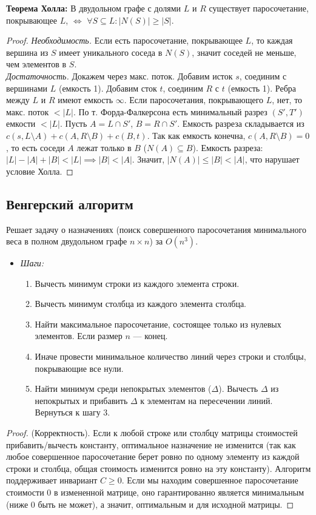 \documentclass[12pt, a4paper]{article}
\begin{document}
\textbf{Теорема Холла:} В двудольном графе с долями $L$ и $R$ существует паросочетание, покрывающее $L$, $\iff$ $\forall S \subseteq L: |N(S)| \ge |S|$.
\begin{proof}
\textit{Необходимость.} Если есть паросочетание, покрывающее $L$, то каждая вершина из $S$ имеет уникального соседа в $N(S)$, значит соседей не меньше, чем элементов в $S$.\\
\textit{Достаточность.} Докажем через макс. поток. Добавим исток $s$, соединим с вершинами $L$ (емкость 1). Добавим сток $t$, соединим $R$ с $t$ (емкость 1). Ребра между $L$ и $R$ имеют емкость $\infty$. Если паросочетания, покрывающего $L$, нет, то макс. поток $< |L|$. По т. Форда-Фалкерсона есть минимальный разрез $(S', T')$ емкости $< |L|$. Пусть $A = L \cap S'$, $B = R \cap S'$. Емкость разреза складывается из $c(s, L \setminus A) + c(A, R \setminus B) + c(B, t)$. Так как емкость конечна, $c(A, R \setminus B) = 0$, то есть соседи $A$ лежат только в $B$ ($N(A) \subseteq B$). Емкость разреза: $|L| - |A| + |B| < |L| \implies |B| < |A|$. Значит, $|N(A)| \le |B| < |A|$, что нарушает условие Холла.
\end{proof}

\subsection{Венгерский алгоритм}
Решает задачу о назначениях (поиск совершенного паросочетания минимального веса в полном двудольном графе $n \times n$) за $O(n^3)$.
\begin{itemize}
    \item \textit{Шаги:}
    \begin{enumerate}
        \item Вычесть минимум строки из каждого элемента строки.
        \item Вычесть минимум столбца из каждого элемента столбца.
        \item Найти максимальное паросочетание, состоящее только из нулевых элементов. Если размер $n$ --- конец.
        \item Иначе провести минимальное количество линий через строки и столбцы, покрывающие все нули.
        \item Найти минимум среди непокрытых элементов ($\Delta$). Вычесть $\Delta$ из непокрытых и прибавить $\Delta$ к элементам на пересечении линий. Вернуться к шагу 3.
    \end{enumerate}
\end{itemize}
\begin{proof}
(Корректность). Если к любой строке или столбцу матрицы стоимостей прибавить/вычесть константу, оптимальное назначение не изменится (так как любое совершенное паросочетание берет ровно по одному элементу из каждой строки и столбца, общая стоимость изменится ровно на эту константу). Алгоритм поддерживает инвариант $C \ge 0$. Если мы находим совершенное паросочетание стоимости 0 в измененной матрице, оно гарантированно является минимальным (ниже 0 быть не может), а значит, оптимальным и для исходной матрицы.
\end{proof}
\end{document}
